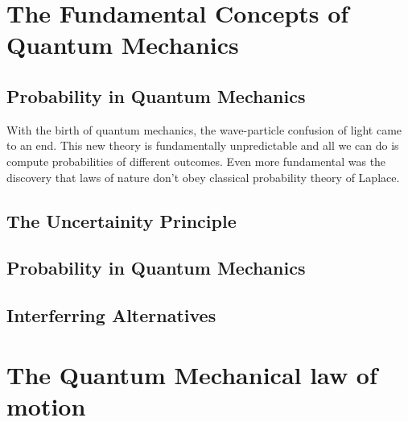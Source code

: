 \documentclass[a4paper, 12pt]{article}
\begin{document}
\section {{\large{\textbf{The Fundamental Concepts of Quantum Mechanics}}}}

\subsection {Probability in Quantum Mechanics}

With the birth of quantum mechanics, the wave-particle confusion of light came to an end. This new theory is fundamentally unpredictable and all we can do is compute probabilities of different outcomes. Even more fundamental was the discovery that laws of nature don't obey classical probability theory of Laplace.

\subsection {The Uncertainity Principle}


\subsection {Probability in Quantum Mechanics}

\subsection {Interferring Alternatives}



\section {{\large{\textbf{The Quantum Mechanical law of motion}}}}
\end{document}
